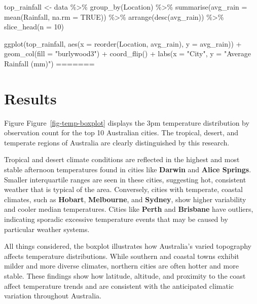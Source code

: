 \documentclass[
  letterpaper,
  DIV=11,
  numbers=noendperiod]{scrartcl}
\newenvironment{Shaded}{\begin{snugshade}}{\end{snugshade}}
\newcommand{\AttributeTok}[1]{\textcolor[rgb]{0.40,0.45,0.13}{#1}}
\newcommand{\ConstantTok}[1]{\textcolor[rgb]{0.56,0.35,0.01}{#1}}
\newcommand{\DecValTok}[1]{\textcolor[rgb]{0.68,0.00,0.00}{#1}}
\newcommand{\FunctionTok}[1]{\textcolor[rgb]{0.28,0.35,0.67}{#1}}
\newcommand{\NormalTok}[1]{\textcolor[rgb]{0.00,0.23,0.31}{#1}}
\newcommand{\OtherTok}[1]{\textcolor[rgb]{0.00,0.23,0.31}{#1}}
\newcommand{\SpecialCharTok}[1]{\textcolor[rgb]{0.37,0.37,0.37}{#1}}
\newcommand{\StringTok}[1]{\textcolor[rgb]{0.13,0.47,0.30}{#1}}
\begin{document}
\begin{Shaded}
\begin{Highlighting}[]
\begin{Shaded}
\begin{Highlighting}[]
\begin{Shaded}
\begin{Highlighting}[]
\begin{Shaded}
\begin{Highlighting}[]
\NormalTok{top\_rainfall }\OtherTok{\textless{}{-}}\NormalTok{ data }\SpecialCharTok{\%\textgreater{}\%}
  \FunctionTok{group\_by}\NormalTok{(Location) }\SpecialCharTok{\%\textgreater{}\%}
  \FunctionTok{summarise}\NormalTok{(}\AttributeTok{avg\_rain =} \FunctionTok{mean}\NormalTok{(Rainfall, }\AttributeTok{na.rm =} \ConstantTok{TRUE}\NormalTok{)) }\SpecialCharTok{\%\textgreater{}\%}
  \FunctionTok{arrange}\NormalTok{(}\FunctionTok{desc}\NormalTok{(avg\_rain)) }\SpecialCharTok{\%\textgreater{}\%}
  \FunctionTok{slice\_head}\NormalTok{(}\AttributeTok{n =} \DecValTok{10}\NormalTok{)}

\FunctionTok{ggplot}\NormalTok{(top\_rainfall, }\FunctionTok{aes}\NormalTok{(}\AttributeTok{x =} \FunctionTok{reorder}\NormalTok{(Location, avg\_rain), }\AttributeTok{y =}\NormalTok{ avg\_rain)) }\SpecialCharTok{+}
  \FunctionTok{geom\_col}\NormalTok{(}\AttributeTok{fill =} \StringTok{"burlywood3"}\NormalTok{) }\SpecialCharTok{+}
  \FunctionTok{coord\_flip}\NormalTok{() }\SpecialCharTok{+}
  \FunctionTok{labs}\NormalTok{(}\AttributeTok{x =} \StringTok{"City"}\NormalTok{, }\AttributeTok{y =} \StringTok{"Average Rainfall (mm)"}\NormalTok{)}
=======
\section{Results}\label{results}

Figure Figure~\ref{fig-temp-boxplot} displays the 3pm temperature
distribution by observation count for the top 10 Australian cities. The
tropical, desert, and temperate regions of Australia are clearly
distinguished by this research.

Tropical and desert climate conditions are reflected in the highest and
most stable afternoon temperatures found in cities like \textbf{Darwin}
and \textbf{Alice Springs}. Smaller interquartile ranges are seen in
these cities, suggesting hot, consistent weather that is typical of the
area. Conversely, cities with temperate, coastal climates, such as
\textbf{Hobart}, \textbf{Melbourne}, and \textbf{Sydney}, show higher
variability and cooler median temperatures. Cities like \textbf{Perth}
and \textbf{Brisbane} have outliers, indicating sporadic excessive
temperature events that may be caused by particular weather systems.

All things considered, the boxplot illustrates how Australia's varied
topography affects temperature distributions. While southern and coastal
towns exhibit milder and more diverse climates, northern cities are
often hotter and more stable. These findings show how latitude,
altitude, and proximity to the coast affect temperature trends and are
consistent with the anticipated climatic variation throughout Australia.


\end{Highlighting}
\end{Shaded}
\end{Highlighting}
\end{Shaded}
\end{Highlighting}
\end{Shaded}
\end{Highlighting}
\end{Shaded}
\end{document}
